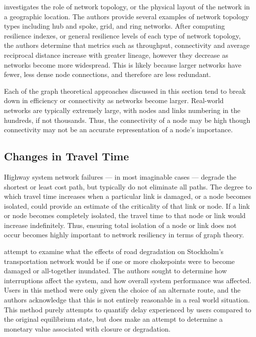 \citet{zhang2015} investigates the role of network topology, or the physical
layout of the network in a geographic location.
The authors provide several examples of network topology types including
hub and spoke, grid, and
ring networks. After computing resilience indexes, or general resilience
levels of each type of
network topology, the authors determine that metrics such as throughput,
connectivity and average
reciprocal distance increase with greater lineage, however they decrease as
networks become
more widespread. This is likely because larger networks have fewer, less dense node
connections, and
therefore are less redundant.

Each of the graph theoretical approaches discussed in this section tend to break
down in efficiency or connectivity as networks become larger. Real-world
networks are typically extremely large, with nodes and links numbering in the
hundreds, if not thousands. Thus, the connectivity of a node may be high though
connectivity may not be an accurate representation of a node's importance.

\subsection{Changes in Travel Time}

Highway system network failures --- in most imaginable cases --- degrade
the
shortest or least cost path, but typically do not eliminate all paths.
The degree
to which travel time increases when a particular link is damaged, or a node
becomes isolated, could
provide an estimate of the criticality of that link or node. If a link or node
becomes completely isolated, the travel time to that node or link would
increase indefinitely. Thus, ensuring total isolation of a node or link does
not occur becomes highly important to network resiliency in terms of graph theory.

\citet{Berdica2007} attempt to examine what the effects of road
degradation on Stockholm's transportation network would be if one or more
chokepoints were to become damaged or all-together inundated. The authors
sought to determine how interruptions affect the system, and how overall
system performance was affected. Users in this method were only given the
choice of an alternate route, and the authors acknowledge that this is not
entirely reasonable in a real world situation. This method purely attempts
to quantify delay experienced by users compared to the original
equilibrium state, but does make an attempt to determine a monetary value
associated with closure or degradation.


